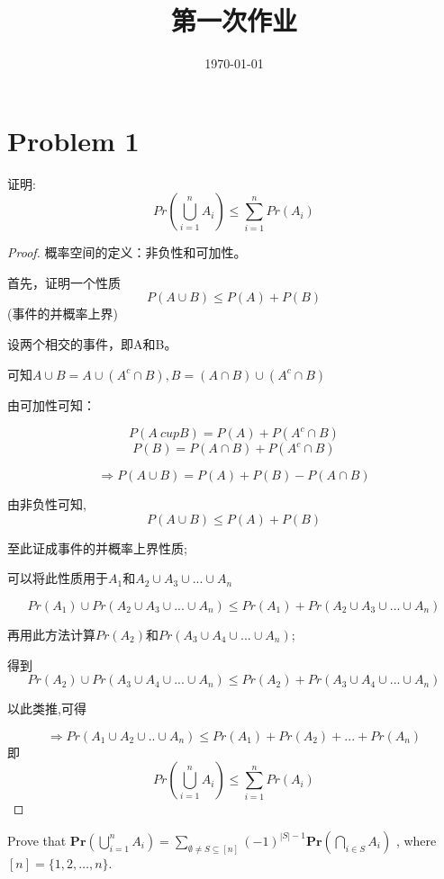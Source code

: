 \documentclass[12pt, a4paper, oneside]{ctexart}
\title{\vspace{-2em}\textbf{第一次作业}}
\date{\today}
\begin{document}
\maketitle
\section*{Problem 1}
\begin{problem}
证明:
$$
  Pr(\bigcup_{i=1}^n A_i) \leq \sum_{i=1}^n Pr(A_i)
$$
\end{problem}

\begin{proof}
  概率空间的定义：非负性和可加性。

  首先，证明一个性质$$P(A\cup B) \leq P(A) + P(B)$$(事件的并概率上界)

  设两个相交的事件，即A和B。

  可知$A \cup B = A\cup (A^c \cap B), B=(A\cap B)\cup (A^c \cap B)$

  由可加性可知：

  $$P(A\ cup B) = P(A)+P(A^c \cap B)$$
  $$P(B) = P(A\cap B) + P(A^c\cap B)$$

  $$\Rightarrow P(A \cup B) = P(A)+P(B) - P(A \cap B)$$

  由非负性可知, $$P(A \cup B) \leq P(A)+P(B)$$

  至此证成事件的并概率上界性质;

  可以将此性质用于$A_1$和$A_2\cup A_3 \cup ... \cup A_n$

  $$Pr(A_1) \cup Pr(A_2\cup A_3 \cup ... \cup A_n) \leq Pr(A_1) + Pr(A_2\cup A_3 \cup ... \cup A_n)$$

  再用此方法计算$Pr(A_2)$和$Pr(A_3\cup A_4 \cup ... \cup A_n)$;

  得到$$Pr(A_2) \cup Pr(A_3\cup A_4 \cup ... \cup A_n) \leq Pr(A_2) + Pr(A_3\cup A_4 \cup ... \cup A_n)$$

  以此类推,可得

  $$\Rightarrow Pr(A_1 \cup A_2 \cup .. \cup A_n) \leq Pr(A_1) + Pr(A_2) + ... + Pr(A_n)$$
  即
  $$Pr(\bigcup_{i=1}^n A_i) \leq \sum_{i=1}^n Pr(A_i)
  $$
\end{proof}


\begin{problem}
 Prove that
$\mathbf{Pr}\left( \bigcup_{i=1}^n A_i\right) = \sum_{\emptyset \neq S \subseteq [n]} (-1)^{|S|-1} \mathbf{Pr}\left( \bigcap_{i \in S} A_i \right) $
, where$ [n]=\{1,2,\ldots,n\} $.
\end{problem}
\end{document}
